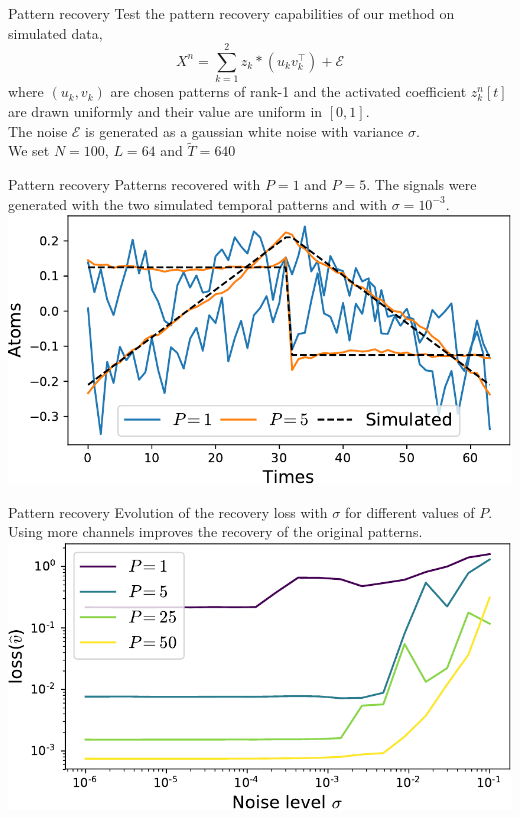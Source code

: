 \documentclass{beamer}
\def\tT{\widetilde{T}}
\begin{document}
\begin{frame}{Pattern recovery}
Test the pattern recovery capabilities of our method on simulated data,
\[
	X^n = \sum_{k=1}^2 z_k * (u_kv_k^\top) + \mathcal E
\]
where $(u_k, v_k)$ are chosen patterns of rank-1 and the activated coefficient $z^n_k[t]$ are drawn uniformly and their value are uniform in $[0, 1]$.\\[1em]
The noise $\mathcal E$ is generated as a gaussian white noise with variance $\sigma$.\\[1em]

We set $N=100$, $L=64$ and $\tT=640$
\end{frame}

\begin{frame}{Pattern recovery}
Patterns recovered with $P = 1$ and $P=5$. The signals were generated with the two simulated temporal patterns and with  $\sigma = 10^{-3}$. \\[1em]
\includegraphics[width=\textwidth]{1D_vs_multi_uv_hat_P5.pdf}
\end{frame}
\begin{frame}{Pattern recovery}
Evolution of the recovery loss with $\sigma$ for different values of $P$. Using more channels improves the recovery of the original patterns.\\[1em]
\includegraphics[width=\textwidth]{1D_vs_multi.pdf}
\end{frame}
\end{document}
